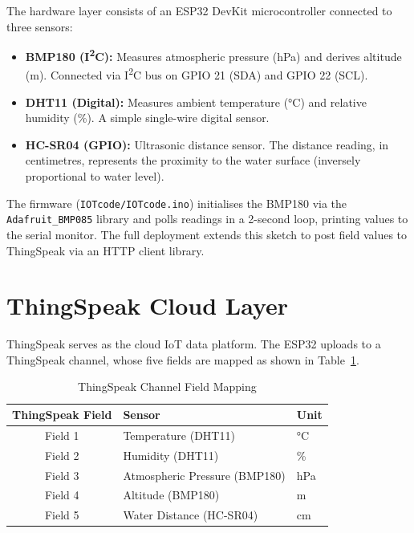 The hardware layer consists of an ESP32 DevKit microcontroller connected to three sensors:

\begin{itemize}[leftmargin=1.5em]
  \item \textbf{BMP180 (I\textsuperscript{2}C):} Measures atmospheric pressure (hPa) and derives altitude (m). Connected via I\textsuperscript{2}C bus on GPIO 21 (SDA) and GPIO 22 (SCL).
  \item \textbf{DHT11 (Digital):} Measures ambient temperature (°C) and relative humidity (\%). A simple single-wire digital sensor.
  \item \textbf{HC-SR04 (GPIO):} Ultrasonic distance sensor. The distance reading, in centimetres, represents the proximity to the water surface (inversely proportional to water level).
\end{itemize}

The firmware (\texttt{IOTcode/\allowbreak{}IOTcode.\allowbreak{}ino}) initialises the BMP180 via the \texttt{Adafruit\_\allowbreak{}BMP085} library and polls readings in a 2-second loop, printing values to the serial monitor. The full deployment extends this sketch to post field values to ThingSpeak via an HTTP client library.

\section{ThingSpeak Cloud Layer}

ThingSpeak serves as the cloud IoT data platform. The ESP32 uploads to a ThingSpeak channel, whose five fields are mapped as shown in Table~\ref{tab:thingspeak_fields}.

\begin{table}[H]
\centering
\caption{ThingSpeak Channel Field Mapping}
\label{tab:thingspeak_fields}
\begin{tabular}{|c|l|l|}
\hline
\rowcolor{FloodLight}
\textbf{ThingSpeak Field} & \textbf{Sensor} & \textbf{Unit} \\
\hline
Field 1 & Temperature (DHT11) & °C \\
Field 2 & Humidity (DHT11) & \% \\
Field 3 & Atmospheric Pressure (BMP180) & hPa \\
Field 4 & Altitude (BMP180) & m \\
Field 5 & Water Distance (HC-SR04) & cm \\
\hline
\end{tabular}
\end{table}

